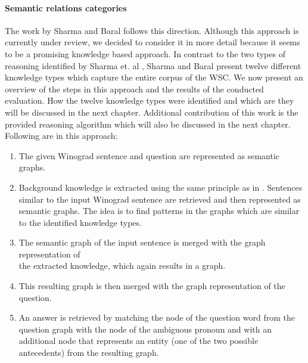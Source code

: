 \paragraph{Semantic relations categories}
The work by Sharma and Baral \cite{2018CommonsenseKT} follows this direction. Although this approach is currently under review, we decided to consider it in more detail because it seems to be a promising knowledge based approach. In contrast to the two types of reasoning identified by Sharma et. al \cite{DBLP:conf/ijcai/SharmaVAB15}, Sharma and Baral \cite{2018CommonsenseKT} present twelve different knowledge types which capture the entire corpus of the WSC. We now present an overview of the steps in this approach and the results of the conducted evaluation. How the twelve knowledge types were identified and which are they will be discussed in the next chapter. Additional contribution of this work is the provided reasoning algorithm which will also be discussed in the next chapter. 
 \\ Following are  in this approach: 
\begin{enumerate}
	\item The given Winograd sentence and question are represented as semantic graphs.
	\item Background knowledge is extracted using the same principle as in \cite{DBLP:conf/ijcai/SharmaVAB15}. Sentences similar to the input Winograd sentence are retrieved and then represented as semantic graphs. The idea is to find patterns in the graphs which are similar to the identified knowledge types. 
	\item The semantic graph of the input sentence is merged with the graph representation of \\
	 the extracted knowledge, which again results in a graph.
	\item This resulting graph is then merged with the graph representation of the question.
	\item An answer is retrieved by matching the node of the question word from the question graph with the node of the ambiguous pronoun and with an additional node that represents an entity (one of the two possible antecedents) from the resulting graph. 
\end{enumerate}

